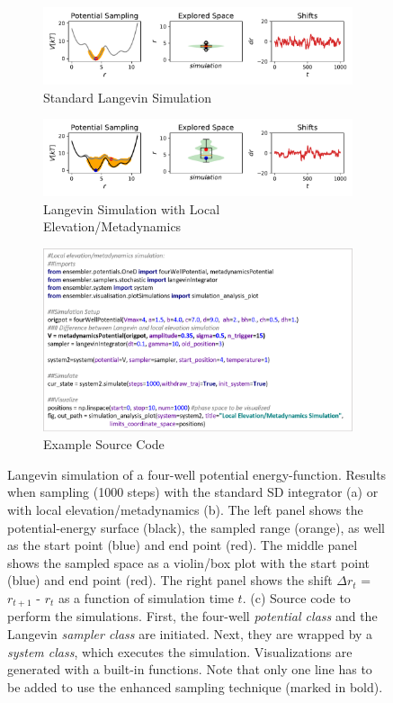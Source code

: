 \begin{figure}[h]
	\centering
	\begin{subfigure}{\textwidth}
		\caption{Standard Langevin Simulation}
		\centering
		\includegraphics[width=0.85\linewidth]{fig/codeExamples/langevin_simulation.pdf} 
	\end{subfigure}
	\vspace{2.5mm}
	\begin{subfigure}{\textwidth}
		\caption{Langevin Simulation with Local Elevation/Metadynamics}
		\centering
		\includegraphics[width=0.85\linewidth]{fig/codeExamples/metaDynamics_simulation.pdf}
	\end{subfigure}
	\vspace{2.5mm}
	\begin{subfigure}{\textwidth}
		\caption{Example Source Code}
		\centering
		\includegraphics[width=0.85\linewidth]{fig/codeExamples/Simulation_code.png}
	\end{subfigure}
\caption{Langevin simulation of a four-well potential energy-function. Results when sampling (1000 steps) with the standard SD integrator (a) or with local elevation\cite{Huber1994}/metadynamics\cite{Laio2002} (b). The left panel shows the potential-energy surface (black), the sampled range (orange), as well as the start point (blue) and end point (red). The middle panel shows the sampled space as a violin/box plot with the start point (blue) and end point (red). The right panel shows the shift $\Delta r_t$ = $r_{t+1}$ - $r_t$ as a function of simulation time $t$.
	(c) Source code to perform the simulations. First, the four-well \textit{potential class} and the Langevin \textit{sampler class} are initiated. Next, they are wrapped by a \textit{system class}, which executes the simulation. Visualizations are generated with a built-in functions. Note that only one line has to be added to use the enhanced sampling technique (marked in bold).}
\label{fig:code_example_simulations}
\end{figure}

